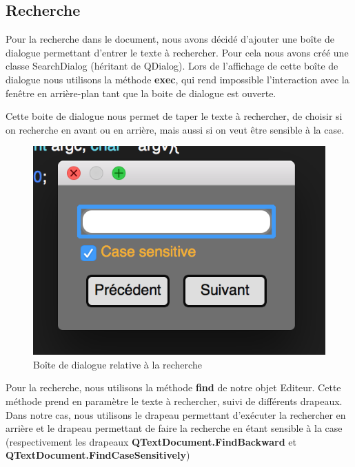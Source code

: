 \documentclass[a4paper,12pt]{article}
\begin{document}
	\newpage
	\subsection{Recherche}

	Pour la recherche dans le document, nous avons décidé d'ajouter une boîte de dialogue permettant d'entrer le texte à rechercher. Pour cela nous avons créé une classe SearchDialog (héritant de QDialog). Lors de l'affichage de cette boîte de dialogue nous utilisons la méthode \textbf{exec}, qui rend impossible l'interaction avec la fenêtre en arrière-plan tant que la boite de dialogue est ouverte.

	Cette boite de dialogue nous permet de taper le texte à rechercher, de choisir si on recherche en avant ou en arrière, mais aussi si on veut être sensible à la case.

	\begin{figure}[h!]
		\begin{center}
			\includegraphics[scale=0.8]{images/imgs_edit/boite_dialog_recherche}
			\caption{Boîte de dialogue relative à la recherche}
		\end{center}
	\end{figure}

	Pour la recherche, nous utilisons la méthode \textbf{find} de notre objet Editeur. Cette méthode prend en paramètre le texte à rechercher, suivi de différents drapeaux. Dans notre cas, nous utilisons le drapeau permettant d'exécuter la rechercher en arrière et le drapeau permettant de faire la recherche en étant sensible à la case (respectivement les drapeaux \textbf{QTextDocument.FindBackward} et \textbf{QTextDocument.FindCaseSensitively})
\end{document}
